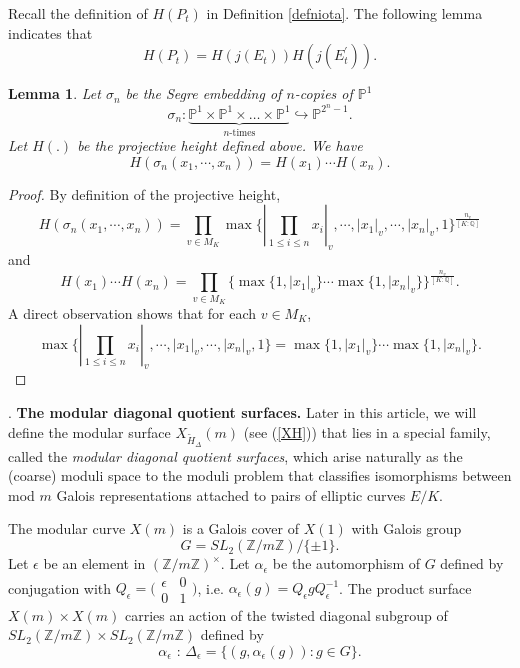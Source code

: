 \documentclass[12pt]{amsart}
\newtheorem{lem}[thm]{Lemma}
\theoremstyle{definition}
\theoremstyle{remark}
\numberwithin{equation}{section}
\newcommand{\Z}{\mathbb{Z}}
\newcommand{\Q}{\mathbb{Q}}
\renewcommand{\P}{\mathbb{P}}
\begin{document}
Recall the definition of $H(P_{t})$ in Definition \ref{defniota}. The following lemma indicates that $$H(P_{t})=H(j(E_{t}))H(j(E_{t}^{\prime})).$$
\begin{lem}\label{ProductHeights}
Let $\sigma_{n}$ be the Segre embedding of $n$-copies of $\P^{1}$
$$\sigma_{n}\colon \underbrace{\P^{1} \times \P^{1} \times \ldots \times \P^{1}}_{n\text{-times}} \hookrightarrow \P^{2^{n}-1}.  $$  Let $H(.)$ be the projective height defined above. We have 
$$H(\sigma_{n}(x_1, \cdots, x_{n}))=H(x_{1})\cdots H(x_{n}).$$
	
\end{lem}

\begin{proof}
	By definition of the projective height,
			$$H(\sigma_{n}(x_1, \cdots, x_{n})) = \prod_{v \in M_{K}}\max \{   |\prod_{1 \le i \le n}x_{i}|_{v}, \cdots, |x_{1}|_{v}, \cdots, |x_{n}|_{v}, 1\}^{\frac{n_{v}}{[K:\Q]}}$$
and $$H(x_{1})\cdots H(x_{n})=\prod_{v \in M_{K}} \{\max\{1, |x_{1}|_{v}\} \cdots \max\{1, |x_{n}|_{v}\}\}^{\frac{n_{v}}{[K:\Q]}}.$$
A direct observation shows that for each $v \in M_{K}$, 
$$\max\{ |\prod_{1 \le i \le n}x_{i}|_{v}, \cdots, |x_{1}|_{v}, \cdots, |x_{n}|_{v}, 1 \} = \max\{1, |x_{1}|_{v}\} \cdots \max\{1, |x_{n}|_{v}\}.$$
\end{proof}

\vspace{1em}  

. \textbf{The modular diagonal quotient surfaces.} Later in this article, we will define the modular surface $X_{\tilde{H}_{\Delta}}(m)$ (see (\ref{XH})) that lies in a special family, called the \textit{modular diagonal quotient surfaces}, which arise naturally as the (coarse) moduli space to the moduli problem that classifies isomorphisms between mod $m$ Galois representations attached to pairs of elliptic curves $E / K$.

The modular curve $X(m)$ is a Galois cover of $X(1)$ with Galois group $$G=SL_{2}(\Z/m\Z)/\{\pm 1\}.$$ 
Let $\epsilon$ be an element in $(\Z/m\Z)^{\times}$. Let $\alpha_{\epsilon}$ be the automorphism of $G$ defined by conjugation with $Q_{\epsilon}=\big(\begin{smallmatrix}
  \epsilon & 0\\
  0 & 1
\end{smallmatrix}\big)$, i.e. $\alpha_{\epsilon}(g)=Q_{\epsilon}gQ_{\epsilon}^{-1}$. The product surface $X(m) \times X(m)$ carries an action of the twisted diagonal subgroup of $SL_{2}(\Z/m\Z) \times SL_{2}(\Z/m\Z)$ defined by $$\alpha_{\epsilon} \text{ : } \Delta_{\epsilon}=\{(g, \alpha_{\epsilon}(g)): g \in G\}.$$
\end{document}
